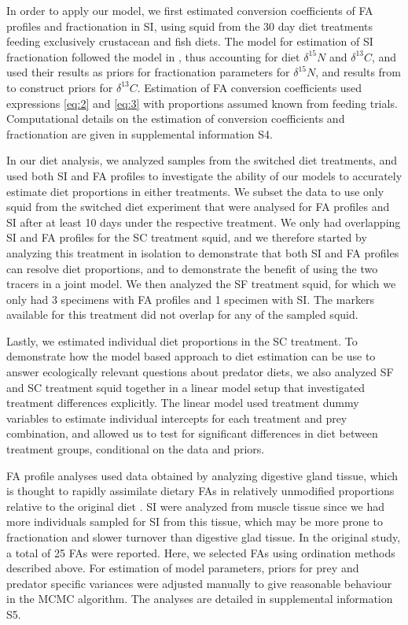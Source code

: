 \documentclass[fleqn,10pt]{wlpeerj}
\begin{document}
In order to apply our model, we first estimated conversion
coefficients of FA profiles and fractionation in SI, using squid from the 30
day diet treatments feeding exclusively crustacean and fish diets. The
model for estimation of SI fractionation followed the model in
\citet{hussey_rescaling_2014}, thus accounting for diet $\delta^{15}N$
and $\delta^{13}C$, and used their results as priors for fractionation
parameters for $\delta^{15}N$, and results from \citet{caut_variation_2009} to
construct priors for $\delta^{13}C$. Estimation of FA conversion coefficients used expressions \eqref{eq:2} and \eqref{eq:3} with proportions assumed known from feeding
 trials. Computational details on the estimation of conversion coefficients and
 fractionation are given in supplemental information S4.

In our diet analysis, we analyzed samples from the switched diet treatments, and
used both SI and FA profiles to investigate the ability of our models to accurately estimate diet
proportions in either treatments. We subset the data to use only
squid from the switched diet experiment that were analysed for FA profiles and SI after at least
10 days under the respective treatment. We only had overlapping
SI and FA profiles for the SC treatment squid, and we therefore started by analyzing this treatment in isolation to
demonstrate that both SI and FA profiles can resolve diet proportions, and to
demonstrate the benefit of using the two tracers in a joint model. We
then analyzed the SF treatment squid, for which we only had 3 specimens with FA profiles
and 1 specimen with SI. The markers available for this treatment did
not overlap for any of the sampled squid. 

Lastly, we estimated individual diet proportions in the SC
treatment. To demonstrate how the model based approach to diet estimation can be
use to answer ecologically relevant questions about predator
diets, we also analyzed SF and SC treatment squid together in a linear model
setup that investigated treatment differences explicitly. The linear
model used treatment dummy variables to estimate individual intercepts
for each treatment and prey combination, and allowed us to test for significant differences in diet between treatment groups,
conditional on the data and priors.

FA profile analyses used data obtained by analyzing digestive gland tissue, which is thought to
rapidly assimilate dietary FAs in relatively unmodified
proportions relative to the original diet \citep[e.g.,]{phillips2001predation}. SI were analyzed from
muscle tissue since we had more individuals sampled for SI from this tissue, which may be more prone to fractionation and slower
turnover than digestive glad tissue. In the original study, a total of
25 FAs were reported. Here, we selected FAs using ordination
methods described above. For estimation of model parameters, priors for
prey and predator specific variances were adjusted manually to give
reasonable behaviour in the MCMC algorithm. The analyses are detailed
in supplemental information S5.
\end{document}
